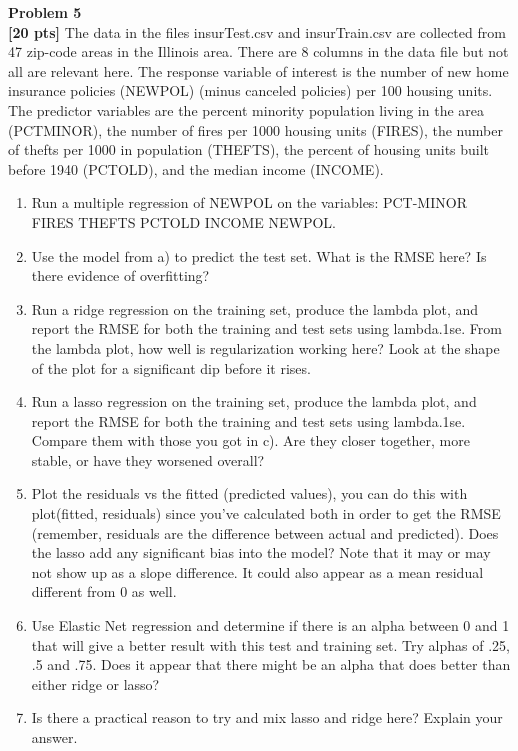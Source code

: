 \documentclass{article}
\newenvironment{problem}[2][Problem]
    { \begin{mdframed}[backgroundcolor=gray!20] \textbf{#1 #2} \\}
    {  \end{mdframed}}
\begin{document}
\newpage
\begin{problem}{5}
\textbf{[20 pts]}
The data in the files insurTest.csv and insurTrain.csv are collected from 47 zip-code areas in the Illinois area. There are 8 columns in the data file but not all are relevant here. The response variable of interest is the number of new home insurance policies (NEWPOL) (minus canceled policies) per 100 housing units. The predictor variables are the percent minority population living in the area (PCTMINOR), the number of fires per 1000 housing units (FIRES), the number of thefts per 1000 in population (THEFTS), the percent of housing units built before 1940 (PCTOLD), and the median income (INCOME).
\begin{enumerate}
	\item Run a multiple regression of NEWPOL on the variables: PCT-MINOR FIRES THEFTS PCTOLD INCOME NEWPOL.
	\item Use the model from a) to predict the test set. What is the RMSE here? Is there evidence of overfitting?
	\item Run a ridge regression on the training set, produce the lambda plot, and report the RMSE for both the training and test sets using lambda.1se. From the lambda plot, how well is regularization working here? Look at the shape of the plot for a significant dip before it rises.
	\item Run a lasso regression on the training set, produce the lambda plot, and report the RMSE for both the training and test sets using lambda.1se. Compare them with those you got in c). Are they closer together, more stable, or have they worsened overall?
	\item Plot the residuals vs the fitted (predicted values), you can do this with plot(fitted, residuals) since you’ve calculated both in order to get the RMSE (remember, residuals are the difference between actual and predicted). Does the lasso add any significant bias into the model? Note that it may or may not show up as a slope difference. It could also appear as a mean residual different from 0 as well.
	\item Use Elastic Net regression and determine if there is an alpha between 0 and 1 that will give a better result with this test and training set. Try alphas of .25, .5 and .75. Does it appear that there might be an alpha that does better than either ridge or lasso?
	\item Is there a practical reason to try and mix lasso and ridge here? Explain your answer.
\end{enumerate}
\end{problem}
\end{document}
